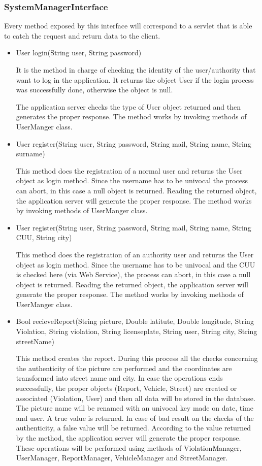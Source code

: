 \subsubsection{SystemManagerInterface}
Every method exposed by this interface will correspond to a servlet that is able to catch the request and return data to the client.
\begin{itemize}
	\item 
	User login(String user, String password)
	
	It is the method in charge of checking the identity of the user/authority that want to log in the application. It returns the object User if the login process was successfully done, otherwise the object is null. 
	
	The application server checks the type of User object returned and then generates the proper response.
	The method works by invoking methods of UserManger class.
	
	\item 
	User register(String user, String password, String mail, String name, String surname)
	
	This method does the registration of a normal user and returns the User object as login method. Since the username has to be univocal the process can abort, in this case a null object is returned.
	Reading the returned object, the application server will generate the proper response.
	The method works by invoking methods of UserManger class.
	
	\item 
	User register(String user, String password, String mail, String name, String CUU, String city)
	
	This method does the registration of an authority user and returns the User object as login method. Since the username has to be univocal and the CUU is checked here (via Web Service), the process can abort, in this case a null object is returned.
	Reading the returned object, the application server will generate the proper response.
	The method works by invoking methods of UserManger class.
	
	\item
	 Bool recieveReport(String picture, Double latitute, Double longitude, String Violation, String violation, String licenseplate, String user, String city, String streetName)
	 
	 This method creates the report. During this process all the checks concerning the authenticity of the picture are performed and the coordinates are transformed into street name and city. In case the operations ends successfully, the proper objects (Report, Vehicle, Street) are created or associated (Violation, User) and then all data will be stored in the database. The picture name will be renamed with an univocal key made on date, time and user. A true value is returned.
	 In case of bad result on the checks of the authenticity, a false value will be returned.
	 According to the value returned by the method, the application server will generate the proper response. 
	 These operations will be performed using methods of ViolationManager, UserManager, ReportManager, VehicleManager and StreetManager.
	 

\end{itemize}
